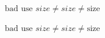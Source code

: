 \documentclass{article}
\begin{document}
	$\text{bad use } size \neq \mathit{size} \neq \mathrm{size}$
	
	\textit{$\text{bad use } size \neq \mathit{size} \neq \mathrm{size}$}
\end{document}
